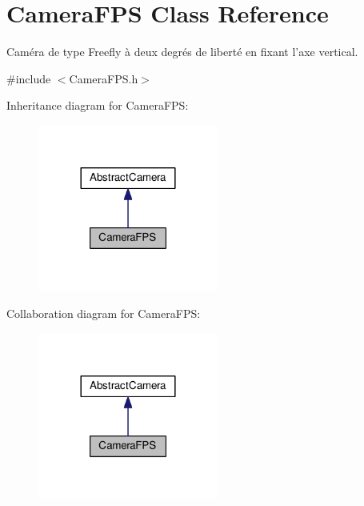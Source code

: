 \hypertarget{classCameraFPS}{\section{Camera\+F\+P\+S Class Reference}
\label{classCameraFPS}
}


Caméra de type Freefly à deux degrés de liberté en fixant l'axe vertical.  




{\ttfamily \#include $<$Camera\+F\+P\+S.\+h$>$}



Inheritance diagram for Camera\+F\+P\+S\+:\nopagebreak
\begin{figure}[H]
\begin{center}
\leavevmode
\includegraphics[width=168pt]{classCameraFPS__inherit__graph}
\end{center}
\end{figure}


Collaboration diagram for Camera\+F\+P\+S\+:\nopagebreak
\begin{figure}[H]
\begin{center}
\leavevmode
\includegraphics[width=168pt]{classCameraFPS__coll__graph}
\end{center}
\end{figure}
